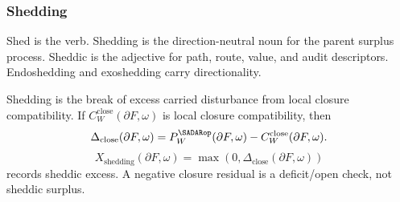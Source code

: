 \subsubsection{Shedding}
\label{subsec:shedding}
\begin{definition}[Shedding]
Shed is the verb. Shedding is the direction-neutral noun for the parent surplus process. Sheddic is the adjective for path, route, value, and audit descriptors. Endoshedding and exoshedding carry directionality.

Shedding is the break of excess carried disturbance from local closure compatibility. If \(C^{\mathrm{close}}_W(\partial F,\omega)\) is local closure compatibility, then
\begin{equation}
\Delta_{\mathrm{close}}(\partial F,\omega)
=
P_W^{\SADARop}(\partial F,\omega)-C^{\mathrm{close}}_W(\partial F,\omega).
\label{eq:closure-residual}
\end{equation}
\begin{equation}
X_{\mathrm{shedding}}(\partial F,\omega)=
\max\!\left(0,
\Delta_{\mathrm{close}}(\partial F,\omega)
\right)
\label{eq:shedding-excess}
\end{equation}
records sheddic excess. A negative closure residual is a deficit/open check, not sheddic surplus.
\end{definition}

